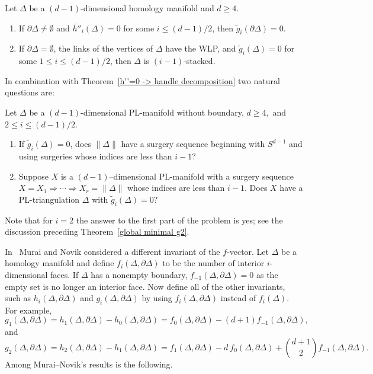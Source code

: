 \documentclass[ALCO,ThmDefs,Unicode,epreuves]{cedram}
\begin{document}
\begin{theorem} 
Let $\Delta$ be a $(d-1)$-dimensional homology manifold and $d \ge 4.$ 
 \begin{enumerate}
 \item\label{theo7.4_1}  If $\partial \Delta \neq \emptyset$ and $\bar{h}''_i(\Delta)=0$ for some $i\leq(d-1)/2$, then $\tilde{g}_i(\partial \Delta) = 0.$
 \item\label{theo7.4_2} If $\partial \Delta = \emptyset$, the links of the vertices of $\Delta$ have the WLP, and $\tilde{g}_i(\Delta)=0$ for some $1\leq i \leq (d-1)/2$, then $\Delta$ is $(i-1)$-stacked.
 \end{enumerate}
\end{theorem}

\noindent In combination with Theorem~\ref{h''=0 -> handle decomposition} two natural questions are:

\begin{ques}
Let $\Delta$ be a $(d-1)$-dimensional PL-manifold without boundary, $d \ge 4,$ and $2 \le i \le (d-1)/2.$
\begin{enumerate}
 \item\label{ques7.5_1} If $\tilde{g}_i(\Delta) =0$, does $\|\Delta\|$ have a surgery sequence beginning with $S^{d-1}$ and using surgeries whose indices are less than $i-1?$ 
 \item\label{ques7.5_2} Suppose $X$ is a $(d-1)$--dimensional PL-manifold with a surgery sequence $X = X_1 \Rightarrow \cdots \Rightarrow X_r = \|\Delta\|$ whose indices are less than $i-1.$ Does $X$ have a PL-triangulation $\Delta$ with $\tilde{g}_i(\Delta) = 0?$
 \end{enumerate}
\end{ques}
\noindent Note that for $i=2$ the answer to the first part of the problem is yes; see the discussion preceding Theorem~\ref{global minimal g2}.

In~\cite{Murai-Novik-bdry} Murai and Novik considered a different invariant of the $f$-vector. Let $\Delta$ be a homology manifold and define $f_i(\Delta, \partial \Delta)$ to be the number of interior $i$-dimensional faces. If $\Delta$ has a nonempty boundary, $f_{-1}(\Delta, \partial \Delta)=0$ as the empty set is no longer an interior face. Now define all of the other invariants, such as $h_i(\Delta,\partial \Delta)$ and $g_i(\Delta, \partial \Delta)$ by using $f_i(\Delta, \partial \Delta)$ instead of $f_i(\Delta).$ For example,
\[
g_1(\Delta, \partial \Delta) = h_1(\Delta, \partial \Delta) - h_0(\Delta, \partial \Delta) = f_0(\Delta, \partial \Delta) - (d+1) f_{-1}(\Delta, \partial \Delta),
\]
and
\[
g_2(\Delta, \partial \Delta) = h_2(\Delta, \partial \Delta) - h_1(\Delta, \partial \Delta) = f_1(\Delta, \partial \Delta) - d ~ f_0(\Delta, \partial \Delta) + \binom{d+1}{2} f_{-1}(\Delta, \partial \Delta).
\]
Among Murai--Novik's results is the following.
\end{document}
